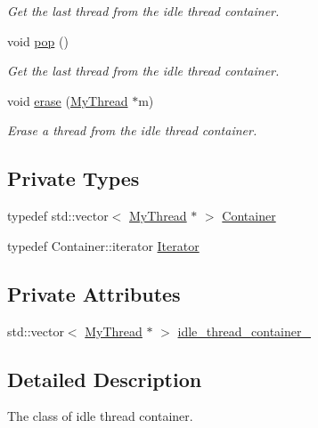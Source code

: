 \begin{DoxyCompactItemize}
\begin{DoxyCompactList}\small\item\em Get the last thread from the idle thread container. \end{DoxyCompactList}\item 
void \hyperlink{classIdleThreadContainer_a1debcb3e02119e266a8f1c641ba458c2}{pop} ()
\begin{DoxyCompactList}\small\item\em Get the last thread from the idle thread container. \end{DoxyCompactList}\item 
void \hyperlink{classIdleThreadContainer_a16a7d9ff37543470418fe401a9260594}{erase} (\hyperlink{classMyThread}{My\+Thread} $\ast$m)
\begin{DoxyCompactList}\small\item\em Erase a thread from the idle thread container. \end{DoxyCompactList}\end{DoxyCompactItemize}
\subsection*{Private Types}
\begin{DoxyCompactItemize}
\item 
typedef std\+::vector$<$ \hyperlink{classMyThread}{My\+Thread} $\ast$ $>$ \hyperlink{classIdleThreadContainer_a640f978c12404f8c82fc6052b3f7ef12}{Container}
\item 
typedef Container\+::iterator \hyperlink{classIdleThreadContainer_a5e29f54ae2f9d426521ed58c06794cf7}{Iterator}
\end{DoxyCompactItemize}
\subsection*{Private Attributes}
\begin{DoxyCompactItemize}
\item 
std\+::vector$<$ \hyperlink{classMyThread}{My\+Thread} $\ast$ $>$ \hyperlink{classIdleThreadContainer_a9ae4221b817dbdaa014c88e9eef3f9da}{idle\+\_\+thread\+\_\+container\+\_\+}
\end{DoxyCompactItemize}


\subsection{Detailed Description}
The class of idle thread container. 

